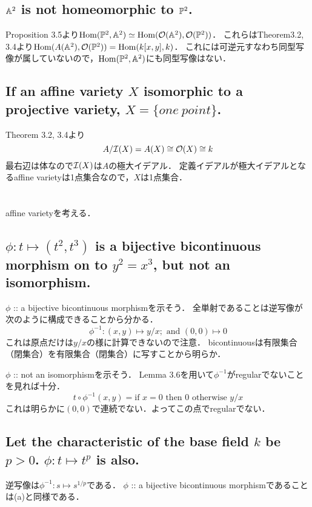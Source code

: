 \documentclass[a4paper]{jarticle}
\newcommand{\mand}{\mbox{ and }}
\newcommand{\regs}{\mathcal{O}}
\begin{document}
    \subsection{$\mathbb{A}^2$ is not homeomorphic to $\mathbb{P}^2$.}
    Proposition 3.5より$\operatorname{Hom}(\mathbb{P}^2, \mathbb{A}^2) \simeq \operatorname{Hom}(\mathcal{O}(\mathbb{A}^2), \mathcal{O}(\mathbb{P}^2))$．
    これらはTheorem3.2, 3.4より$\operatorname{Hom}(A(\mathbb{A}^2), \mathcal{O}(\mathbb{P}^2))=\operatorname{Hom}(k[x,y], k)$．
    これには可逆元すなわち同型写像が属していないので，$\operatorname{Hom}(\mathbb{P}^2, \mathbb{A}^2)$にも同型写像はない．

    \subsection{If an affine variety $X$ isomorphic to a projective variety, $X=\{one~point\}$.}
    Theorem 3.2, 3.4より
    \[ A/\defs(X)=A(X) \cong \regs(X) \cong k \]
    最右辺は体なので$\mathcal{I}(X)$は$A$の極大イデアル．
    定義イデアルが極大イデアルとなるaffine varietyは1点集合なので，$X$は1点集合．

\section{} %
    affine varietyを考える．
    \subsection{$\phi: t \mapsto (t^2,t^3)$ is a bijective bicontinuous morphism on to $y^2=x^3$, but not an isomorphism.}
    $\phi$ :: a bijective bicontinuous morphismを示そう．
    全単射であることは逆写像が次のように構成できることから分かる．
    \[ \phi^{-1}: (x,y) \mapsto y/x; \mand (0,0) \mapsto 0 \]
    これは原点だけは$y/x$の様に計算できないので注意．
    bicontinuousは有限集合（閉集合）を有限集合（閉集合）に写すことから明らか．

    $\phi$ :: not an isomorphismを示そう．
    Lemma 3.6を用いて$\phi^{-1}$がregularでないことを見れば十分．
    \[ t \circ \phi^{-1}(x,y)=\mbox{if $x=0$ then $0$ otherwise $y/x$} \]
    これは明らかに$(0,0)$で連続でない．よってこの点でregularでない．

    \subsection{Let the characteristic of the base field $k$ be $p > 0$. $\phi: t \mapsto t^p$ is also.}
    逆写像は$\phi^{-1}: s \mapsto s^{1/p}$である．
    $\phi$ :: a bijective bicontinuous morphismであることは(a)と同様である．
\end{document}
